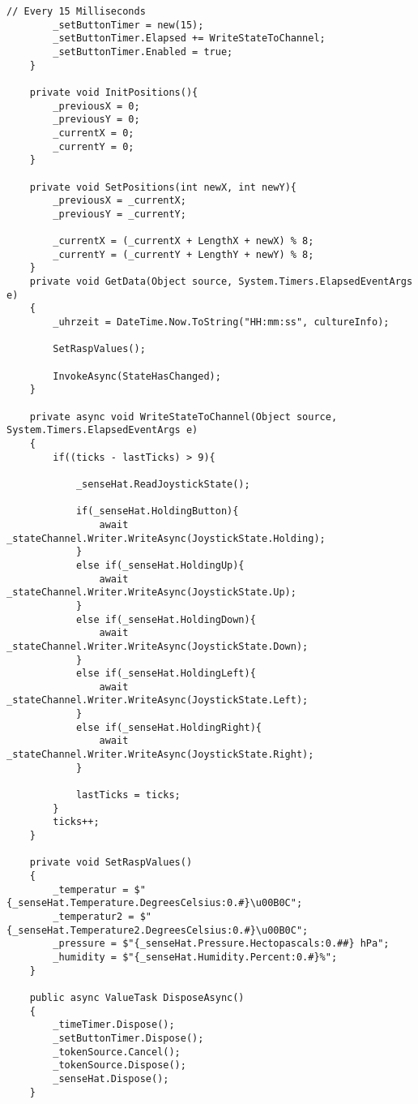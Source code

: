 \begin{lstlisting}[language={[Sharp]C}, caption=Kompletter Demo Code,
	label=lst:DemoCode]
        // Every 15 Milliseconds
        _setButtonTimer = new(15);
        _setButtonTimer.Elapsed += WriteStateToChannel;
        _setButtonTimer.Enabled = true;
    }

    private void InitPositions(){
        _previousX = 0;
        _previousY = 0;
        _currentX = 0;
        _currentY = 0;
    }

    private void SetPositions(int newX, int newY){
        _previousX = _currentX;
        _previousY = _currentY;

        _currentX = (_currentX + LengthX + newX) % 8;
        _currentY = (_currentY + LengthY + newY) % 8;
    }
    private void GetData(Object source, System.Timers.ElapsedEventArgs e)
    {
        _uhrzeit = DateTime.Now.ToString("HH:mm:ss", cultureInfo);

        SetRaspValues();

        InvokeAsync(StateHasChanged);
    }

    private async void WriteStateToChannel(Object source, System.Timers.ElapsedEventArgs e)
    {
        if((ticks - lastTicks) > 9){

            _senseHat.ReadJoystickState();

            if(_senseHat.HoldingButton){
                await _stateChannel.Writer.WriteAsync(JoystickState.Holding);
            }
            else if(_senseHat.HoldingUp){
                await _stateChannel.Writer.WriteAsync(JoystickState.Up);
            }
            else if(_senseHat.HoldingDown){
                await _stateChannel.Writer.WriteAsync(JoystickState.Down);
            }
            else if(_senseHat.HoldingLeft){
                await _stateChannel.Writer.WriteAsync(JoystickState.Left);
            }
            else if(_senseHat.HoldingRight){
                await _stateChannel.Writer.WriteAsync(JoystickState.Right);
            }

            lastTicks = ticks;
        }
        ticks++;
    }

    private void SetRaspValues()
    {
        _temperatur = $"{_senseHat.Temperature.DegreesCelsius:0.#}\u00B0C";
        _temperatur2 = $"{_senseHat.Temperature2.DegreesCelsius:0.#}\u00B0C";
        _pressure = $"{_senseHat.Pressure.Hectopascals:0.##} hPa";
        _humidity = $"{_senseHat.Humidity.Percent:0.#}%";
    }

    public async ValueTask DisposeAsync()
    {
        _timeTimer.Dispose();
        _setButtonTimer.Dispose();
        _tokenSource.Cancel();
        _tokenSource.Dispose();
        _senseHat.Dispose();
    }


\end{lstlisting}
